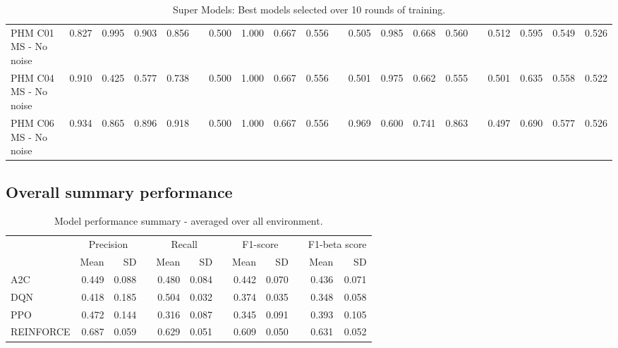 \documentclass[a4paper, 12pt]{article}
\newcommand{\rowspace}[1]{\renewcommand{\arraystretch}{#1}}
\begin{document}
\begin{landscape}
\begin{table}
\begin{tabular}{@{}l rrrr c rrrr c rrrr c rrrr@{}}
			PHM C01 MS - No noise &0.827 &0.995 &0.903 & 0.856 & & 0.500 &1.000 &0.667 &0.556 & &0.505 &0.985 &0.668 &0.560 & &0.512 &0.595 &0.549&0.526\\
			PHM C04 MS - No noise &0.910 &0.425 &0.577 & 0.738 & & 0.500 &1.000 &0.667 &0.556 & &0.501 &0.975 &0.662 &0.555 & &0.501 &0.635 &0.558&0.522\\
			PHM C06 MS - No noise &0.934 &0.865 &0.896 & 0.918 & & 0.500 &1.000 &0.667 &0.556 & &0.969 &0.600 &0.741 &0.863 & &0.497 &0.690 &0.577&0.526\\			
			\bottomrule
		\end{tabular}
		\caption{Super Models: Best models selected over 10 rounds of training.}
		\label{tbl:SuperModels}
	\end{table}
\end{landscape}
\restoregeometry %

\subsection{Overall summary performance}

\begin{table}[hbt!]\centering
	\sffamily
	\rowspace{1.3}
	\begin{tabular}{@{}l rr c rr c rr c rr@{}}
		\arrayrulecolor{black!40}\toprule
		& \multicolumn{2}{c}{Precision} & \phantom{i} & \multicolumn{2}{c}{Recall} & \phantom{i} & \multicolumn{2}{c}{F1-score} & \phantom{i} & \multicolumn{2}{c}{F1-beta score} \\
		\cmidrule{2-3} \cmidrule{5-6} \cmidrule{8-9} \cmidrule{11-12} 
		
		&Mean &SD & &Mean &SD & &Mean &SD& &Mean & SD\\ \midrule
		
		A2C & 0.449 & 0.088 & &0.480 & 0.084 & & 0.442 & 0.070 & &0.436 &0.071 \\
		DQN & 0.418 & 0.185 & &0.504 & 0.032 & & 0.374 & 0.035 & &0.348 &0.058 \\
		PPO & 0.472 & 0.144 & &0.316 & 0.087 & & 0.345 & 0.091 & &0.393 &0.105 \\
		REINFORCE & 0.687 & 0.059 & &0.629 & 0.051 & & 0.609 & 0.050 & &0.631 &0.052 \\
			
		\bottomrule
	\end{tabular}
	\caption{Model performance summary - averaged over all environment.}
	\label{tbl:OverallSummary}
\end{table}
\end{document}
